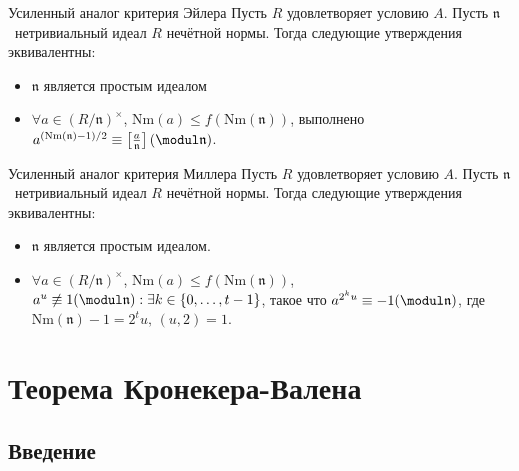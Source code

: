 \documentclass[8pt, xcolor=x11names]{beamer}
\begin{document}
\begin{frame}
    \begin{block}{Усиленный аналог критерия Эйлера}
        Пусть $R$ удовлетворяет условию $A$.
        Пусть $\mathfrak{n}$ \textendash\ нетривиальный идеал $R$ нечётной нормы.
        Тогда следующие утверждения эквивалентны:
        \begin{itemize}
            \item $\mathfrak{n}$ является простым идеалом
            
            \item $\forall a\in(R/\mathfrak{n})^{\times}$,  $\textrm{Nm}(a) \leq  f(\textrm{Nm}(\mathfrak{n}))$, выполнено $a^{(\textrm{Nm}(\mathfrak{n})-1)/2} \equiv \left[\frac{a}{\mathfrak{n}}\right] (\modul \mathfrak{n})$.
        \end{itemize}
    \end{block}
    
    \begin{block}{Усиленный аналог критерия Миллера}
        Пусть $R$ удовлетворяет условию $A$.
        Пусть $\mathfrak{n}$ \textendash\ нетривиальный идеал $R$ нечётной нормы.
        Тогда следующие утверждения эквивалентны:
	    \begin{itemize}
	        \item $\mathfrak{n}$ является простым идеалом.
	        
	        \item $\forall a\in(R/\mathfrak{n})^{\times}$, $\textrm{Nm}(a) \leq f(\textrm{Nm}(\mathfrak{n}))$, $a^u \not\equiv 1 (\modul \mathfrak{n}) : \exists k \in \{0, \dots, t-1\}$, такое что $a^{2^{k}u} \equiv -1 (\modul \mathfrak{n})$, где $\textrm{Nm}(\mathfrak{n}) - 1 = 2^{t}u,\, (u,2) = 1$.
	    \end{itemize}
    \end{block}
\end{frame}

\section{Теорема Кронекера-Валена}

\subsection{Введение}
\end{document}
